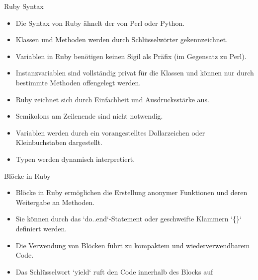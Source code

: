 \documentclass{beamer}
\begin{document}
\begin{frame}{Ruby Syntax}
  \begin{itemize}
    \item Die Syntax von Ruby ähnelt der von Perl oder Python.
    \item Klassen und Methoden werden durch Schlüsselwörter gekennzeichnet.
    \item Variablen in Ruby benötigen keinen Sigil als Präfix (im Gegensatz zu Perl).
    \item Instanzvariablen sind vollständig privat für die Klassen und können nur durch bestimmte Methoden offengelegt werden.
    \item Ruby zeichnet sich durch Einfachheit und Ausdrucksstärke aus.
    \item Semikolons am Zeilenende sind nicht notwendig.
    \item Variablen werden durch ein vorangestelltes Dollarzeichen oder Kleinbuchstaben dargestellt.
    \item Typen werden dynamisch interpretiert.
  \end{itemize}
\end{frame}
\begin{frame}{Blöcke in Ruby}
  \begin{itemize}
    \item Blöcke in Ruby ermöglichen die Erstellung anonymer Funktionen und deren Weitergabe an Methoden.
    \item Sie können durch das `do..end`-Statement oder geschweifte Klammern `\{\}` definiert werden.

    \item Die Verwendung von Blöcken führt zu kompaktem und wiederverwendbarem Code.
    \item Das Schlüsselwort `yield` ruft den Code innerhalb des Blocks auf

  \end{itemize}

\end{frame}
\end{document}
